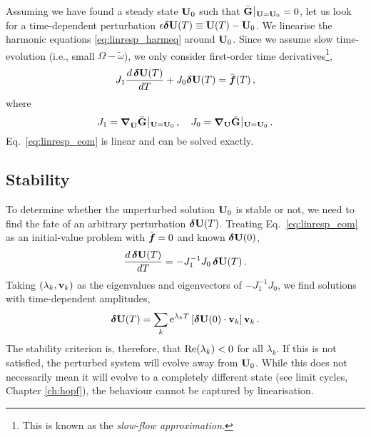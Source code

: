 Assuming we have found a steady state $\vb{U}_0$ such that $\bar{\vb{G}}\, \vline\,_{\vb{U} = \vb{U}_0} = 0$, let us look for a time-dependent perturbation $\epsilon \boldsymbol{\delta} \vb{U}(T) \equiv \vb{U}(T) - \vb{U}_0$. We linearise the harmonic equations \eqref{eq:linresp_harmeq} around $\vb{U}_0$. Since we assume slow time-evolution (i.e., small $\Omega - \tilde{\omega} $), we only consider first-order time derivatives\footnote{This is known as the \textit{slow-flow approximation}.},
\begin{equation} \label{eq:linresp_eom}
J_1 \frac{d \, \boldsymbol{\delta} \vb{U} (T)}{d T} + J_0 \boldsymbol{\delta} \vb{U}(T) = \bar{\boldsymbol{f}}(T)\,,
\end{equation}
where 
\begin{equation}
J_1 = \boldsymbol{\nabla}_{\dot{\vb{U}}} \bar{\vb{G}}\, \vline\,_{\vb{U} = \vb{U}_0} \,, \quad J_0 = \boldsymbol{\nabla}_{\vb{U}} \bar{\vb{G}}\, \vline\,_{\vb{U} = \vb{U}_0} \,.
\end{equation}
Eq.~\eqref{eq:linresp_eom} is linear and can be solved exactly.
\subsection{Stability} \label{sec:linresp_stability}

To determine whether the unperturbed solution $\vb{U}_0$ is stable or not, we need to find the fate of an arbitrary perturbation $\boldsymbol{\delta} \vb{U}(T)$. Treating Eq.~\eqref{eq:linresp_eom} as an initial-value problem with $\bar{\boldsymbol{f}} =0$ and known $\boldsymbol{\delta} \vb{U}(0)$,
\begin{equation} \label{eq:linresp_eom_pert}
\frac{d \, \boldsymbol{\delta} \vb{U} (T)}{d T} = - J_1^{-1} J_0\, \boldsymbol{\delta} \vb{U}(T) \,.
\end{equation}
Taking $(\lambda_k, \vb{v}_k)$ as the eigenvalues and eigenvectors of $-J_1^{-1} J_0$, we find solutions with time-dependent amplitudes,
\begin{equation}
\boldsymbol{\delta} \vb{U}(T) = \sum_k {\rm e}^{\lambda_k T } \left[ \boldsymbol{\delta} \vb{U}(0) \cdot \vb{v}_k \right] \vb{v}_k \,.
\end{equation}
The stability criterion is, therefore, that $\text{Re} (\lambda_k) < 0$ for all $\lambda_k$. If this is not satisfied, the perturbed system will evolve away from $\vb{U}_0$. While this does not necessarily mean it will evolve to a completely different state (see limit cycles, Chapter \ref{ch:hopf}), the behaviour cannot be captured by linearisation.

